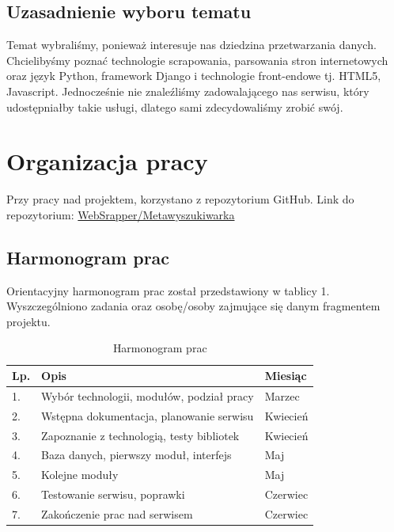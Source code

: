 \documentclass[12pt, titlepage]{article}
\begin{document}
	\subsection{Uzasadnienie wyboru tematu}
	Temat wybraliśmy, ponieważ interesuje nas dziedzina przetwarzania danych. Chcielibyśmy poznać technologie scrapowania, parsowania stron internetowych oraz język Python, framework Django i technologie front-endowe tj. HTML5, Javascript. Jednocześnie nie znaleźliśmy zadowalającego nas serwisu, który udostępniałby takie usługi, dlatego sami zdecydowaliśmy zrobić swój.
	
	\newpage
	\section{Organizacja pracy}
	Przy pracy nad projektem, korzystano z repozytorium GitHub. Link do repozytorium: \newline
	\textcolor{blue}{\href{https://github.com/vizarch/projektPT}{WebSrapper/Metawyszukiwarka}}
	\subsection{Harmonogram prac}
	Orientacyjny harmonogram prac został przedstawiony w tablicy 1. Wyszczególniono zadania oraz osobę/osoby zajmujące się danym fragmentem projektu.
	\begin{table}[H]
		\setlength\extrarowheight{5pt}
		\centering
		\caption{Harmonogram prac}
		\label{harmonogram_prac}
		\begin{tabular}{ | C{2cm} | C{8cm} | C{6cm} | }
			\hline
			\textbf{Lp.} &	\textbf{Opis} &	\textbf{Miesiąc} \\ \hline

			1.& Wybór technologii, modułów, podział pracy & Marzec \\ \hline

			2.&	Wstępna dokumentacja, planowanie serwisu &	Kwiecień \\ \hline

			3.&	Zapoznanie z technologią, testy bibliotek &	Kwiecień \\ \hline

			4.&	Baza danych, pierwszy moduł, interfejs & Maj \\ \hline

			5.&	Kolejne moduły & Maj \\ \hline

			6.&	Testowanie serwisu, poprawki &	Czerwiec \\ \hline

			7.&	Zakończenie prac nad serwisem &	Czerwiec \\ \hline

		\end{tabular}
	\end{table}
	
\end{document}
